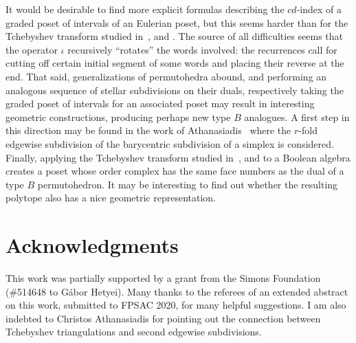 \documentclass[reqno,12pt]{amsart}
\numberwithin{equation}{section}
\newcommand{\0}{\widehat{0}}
\newcommand{\1}{\widehat{1}}
\newcommand{\2}{\widehat{2}}
\newcommand{\iab}{\iota}
\begin{document}
It would be desirable to find more explicit formulas describing the
$cd$-index of a graded poset of intervals of an Eulerian poset, but
this seems harder than for the Tchebyshev transform studied 
in~\cite{Hetyei-tch}, \cite{Hetyei-mfp} and \cite{Ehrenborg-Readdy-Tch}. The
source of all difficulties seems that the operator $\iab$ recursively
``rotates'' the words involved: the recurrences call for cutting off certain
initial segment of some words and placing their reverse at the end. That
said, generalizations of permutohedra abound, and performing an
analogous sequence of stellar subdivisions on their duals, respectively
taking the graded poset of intervals for an associated poset may result
in interesting geometric constructions, producing perhaps new type $B$
analogues. A first step in this direction may be found in the work of
Athanasiadis~\cite{Athanasiadis-BE} where the $r$-fold edgewise
subdivision of the barycentric subdivision of a simplex is considered. 
Finally, applying the Tchebyshev transform studied
in~\cite{Hetyei-tch}, \cite{Hetyei-mfp} and \cite{Ehrenborg-Readdy-Tch} to
a Boolean algebra creates a poset whose order complex has the same
face numbers as the dual of a type $B$ permutohedron. It may be
interesting to find out whether the resulting polytope also has a nice
geometric representation. 


\section*{Acknowledgments}
This work was partially supported by a grant from the Simons Foundation
(\#514648 to G\'abor Hetyei). Many thanks to the referees of an extended
abstract on this work, submitted to FPSAC 2020, for many helpful
suggestions. I am also indebted to Christos Athanasiadis for pointing
out the connection between Tchebyshev triangulations and second edgewise
subdivisions.  
\end{document}
